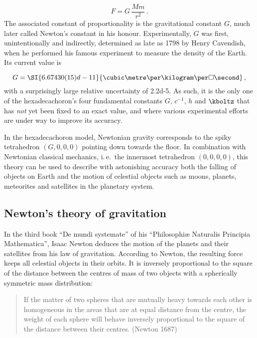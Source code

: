 \documentclass{scrartcl}
\begin{document}
\begin{equation*}\label{eq:gravitation}
  F=G\,\frac{Mm}{r^2}\,.
\end{equation*}
%
The associated constant of proportionality is the gravitational constant $G$, much later called Newton's constant in his honour. Experimentally, $G$ was first, unintentionally and indirectly, determined as late as 1798 by Henry Cavendish, when he performed his famous experiment to measure the density of the Earth. Its current value is

\begin{equation*}
  G = \SI{6.67430(15)d-11}{\cubic\metre\per\kilogram\per\square\second}\,,
\end{equation*}
%
with a surprisingly large relative uncertainty of \num{2.2d-5}. As such, it is the only one of the hexadecachoron's four fundamental constants $G$, $c^{-1}$, $h$ and $\kboltz$ that has \textit{not} yet been fixed to an exact value, and where various experimental efforts are under way to improve its accuracy.

In the hexadecachoron model, Newtonian gravity corresponds to the spiky tetrahedron $(G,0,0,0)$  pointing down towards the floor. In combination with Newtonian classical mechanics, i.\,e.\ the innermost tetrahedron $(0,0,0,0)$, this theory can be used to describe with astonishing accuracy both the falling of objects on Earth and the motion of celestial objects such as moons, planets, meteorites and satellites in the planetary system.


\subsection*{Newton's theory of gravitation}

In the third book \enquote{De mundi systemate} of his \enquote{Philosophiæ Naturalis Principia Mathematica}, Isaac Newton deduces the motion of the planets and their satellites from his law of gravitation. According to Newton, the resulting force keeps all celestial objects in their orbits. It is inversely proportional to the square of the distance between the centres of mass of two objects with a spherically symmetric mass distribution:

\begin{quote}
  If the matter of two spheres that are mutually heavy towards each other is homogeneous in the areas that are at equal distance from the centre, the weight of each sphere will behave inversely proportional to the square of the distance between their centres. (Newton 1687)
\end{quote}
\end{document}
